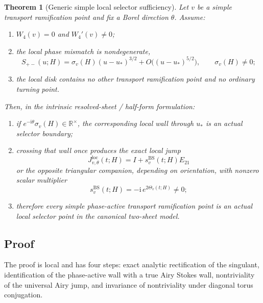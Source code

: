 \documentclass[11pt]{article}
\numberwithin{equation}{section}
\newtheorem{theorem}{Theorem}[section]
\theoremstyle{definition}
\newcommand{\ii}{\mathrm i}
\begin{document}
\begin{theorem}[Generic simple local selector sufficiency]
\label{thm:sufficiency}
Let $v$ be a simple transport ramification point and fix a Borel direction $\theta$. Assume:
\begin{enumerate}
  \item $W_4(v)=0$ and $W_4'(v)\neq 0$;
  \item the local phase mismatch is nondegenerate,
  \begin{equation}
  \label{eq:nondegenerate-sigulant}
  S_{+-}(u;H)=\sigma_v(H)(u-u_*)^{3/2}+O\bigl((u-u_*)^{5/2}\bigr),
  \qquad
  \sigma_v(H)\neq 0;
  \end{equation}
  \item the local disk contains no other transport ramification point and no ordinary turning point.
\end{enumerate}
Then, in the intrinsic resolved-sheet / half-form formulation:
\begin{enumerate}
  \item if $e^{-\ii\theta}\sigma_v(H)\in\mathbb R^\times$, the corresponding local wall through $u_*$ is an actual selector boundary;
  \item crossing that wall once produces the exact local jump
  \begin{equation}
  \label{eq:local-selector-block}
  J^{\mathrm{loc}}_{v,\theta}(t;H)=I+s_v^{\mathrm{BS}}(t;H)E_{21}
  \end{equation}
  or the opposite triangular companion, depending on orientation, with nonzero scalar multiplier
  \begin{equation}
  \label{eq:svBS}
  s_v^{\mathrm{BS}}(t;H)=-\ii\,e^{2\Theta_v(t;H)}\neq 0;
  \end{equation}
  \item therefore every simple phase-active transport ramification point is an actual local selector point in the canonical two-sheet model.
\end{enumerate}
\end{theorem}

\subsection{Proof}

The proof is local and has four steps: exact analytic rectification of the singulant, identification of the phase-active wall with a true Airy Stokes wall, nontriviality of the universal Airy jump, and invariance of nontriviality under diagonal torus conjugation.
\end{document}
